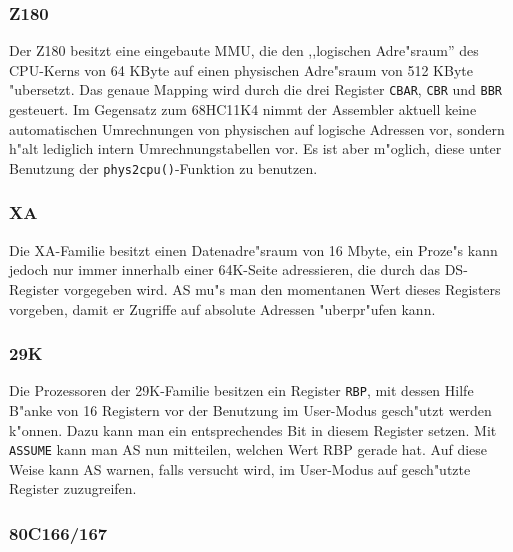 \documentclass[12pt,a4paper,twoside]{report}
\newcommand{\tty}[1]{{\tt #1}}
\begin{document}
\subsubsection{Z180}

Der Z180 besitzt eine eingebaute MMU, die den ,,logischen Adre"sraum'' des
CPU-Kerns von 64 KByte auf einen physischen Adre"sraum von 512 KByte "ubersetzt.
Das genaue Mapping wird durch die drei Register {\tt CBAR}, {\tt CBR} und {\tt BBR}
gesteuert.  Im Gegensatz zum 68HC11K4 nimmt der Assembler aktuell keine 
automatischen Umrechnungen von physischen auf logische Adressen vor, sondern
h"alt lediglich intern Umrechnungstabellen vor.  Es ist aber m"oglich, diese
unter Benutzung der {\tt phys2cpu()}-Funktion zu benutzen.


\subsubsection{XA}

Die XA-Familie besitzt einen Datenadre"sraum von 16 Mbyte, ein Proze"s
kann jedoch nur immer innerhalb einer 64K-Seite adressieren, die
durch das DS-Register vorgegeben wird.  AS mu"s man den momentanen
Wert dieses Registers vorgeben, damit er Zugriffe auf absolute
Adressen "uberpr"ufen kann.


\subsubsection{29K}

Die Prozessoren der 29K-Familie besitzen ein Register \tty{RBP}, mit dessen
Hilfe B"anke von 16 Registern vor der Benutzung im User-Modus gesch"utzt
werden k"onnen.  Dazu kann man ein entsprechendes Bit in diesem Register
setzen.  Mit \tty{ASSUME} kann man AS nun mitteilen, welchen Wert RBP
gerade hat.  Auf diese Weise kann AS warnen, falls versucht wird, im
User-Modus auf gesch"utzte Register zuzugreifen.


\subsubsection{80C166/167}
\end{document}
